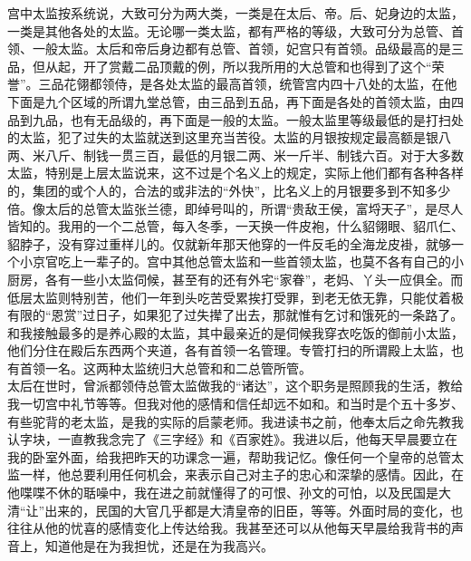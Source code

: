 宫中太监按系统说，大致可分为两大类，一类是在太后、帝。后、妃身边的太监，一类是其他各处的太监。无论哪一类太监，都有严格的等级，大致可分为总管、首领、一般太监。太后和帝后身边都有总管、首领，妃宫只有首领。品级最高的是三品，但从起，开了赏戴二品顶戴的例，所以我所用的大总管和也得到了这个“荣誉”。三品花翎都领侍，是各处太监的最高首领，统管宫内四十八处的太监，在他下面是九个区域的所谓九堂总管，由三品到五品，再下面是各处的首领太监，由四品到九品，也有无品级的，再下面是一般的太监。一般太监里等级最低的是打扫处的太监，犯了过失的太监就送到这里充当苦役。太监的月银按规定最高额是银八两、米八斤、制钱一贯三百，最低的月银二两、米一斤半、制钱六百。对于大多数太监，特别是上层太监说来，这不过是个名义上的规定，实际上他们都有各种各样的，集团的或个人的，合法的或非法的“外快”，比名义上的月银要多到不知多少倍。像太后的总管太监张兰德，即绰号叫的，所谓“贵敌王侯，富埒天子”，是尽人皆知的。我用的一个二总管，每入冬季，一天换一件皮袍，什么貂翎眼、貂爪仁、貂脖子，没有穿过重样儿的。仅就新年那天他穿的一件反毛的全海龙皮褂，就够一个小京官吃上一辈子的。宫中其他总管太监和一些首领太监，也莫不各有自己的小厨房，各有一些小太监伺候，甚至有的还有外宅“家眷”，老妈、丫头一应俱全。而低层太监则特别苦，他们一年到头吃苦受累挨打受罪，到老无依无靠，只能仗着极有限的“恩赏”过日子，如果犯了过失撵了出去，那就惟有乞讨和饿死的一条路了。\\

和我接触最多的是养心殿的太监，其中最亲近的是伺候我穿衣吃饭的御前小太监，他们分住在殿后东西两个夹道，各有首领一名管理。专管打扫的所谓殿上太监，也有首领一名。这两种太监统归大总管和和二总管所管。\\

太后在世时，曾派都领侍总管太监做我的“诸达”，这个职务是照顾我的生活，教给我一切宫中礼节等等。但我对他的感情和信任却远不如和。和当时是个五十多岁、有些驼背的老太监，是我的实际的启蒙老师。我进读书之前，他奉太后之命先教我认字块，一直教我念完了《三字经》和《百家姓》。我进以后，他每天早晨要立在我的卧室外面，给我把昨天的功课念一遍，帮助我记忆。像任何一个皇帝的总管太监一样，他总要利用任何机会，来表示自己对主子的忠心和深挚的感情。因此，在他喋喋不休的聒噪中，我在进之前就懂得了的可恨、孙文的可怕，以及民国是大清“让”出来的，民国的大官几乎都是大清皇帝的旧臣，等等。外面时局的变化，也往往从他的忧喜的感情变化上传达给我。我甚至还可以从他每天早晨给我背书的声音上，知道他是在为我担忧，还是在为我高兴。\\

